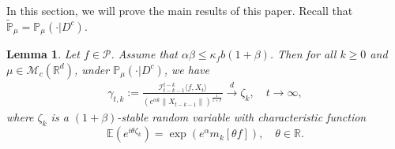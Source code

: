 \documentclass[12pt,a4paper]{amsart}
\theoremstyle{plain}
\newtheorem{lem}[thm]{Lemma}
\theoremstyle{definition}
\numberwithin{equation}{section}
\begin{document}
In this section, we will prove the main results of this paper. Recall that $\mathbb{\tilde{P}}_{\mu}=\mathbb{P}_{\mu}(\cdot|D^c)$.

\begin{lem}\label{lem: mainlemma}
Let $f\in \mathcal{P}$.
Assume that $\alpha\beta\leq \kappa_fb(1+\beta)$.
Then for all $k\geq 0$ and $\mu \in \mathcal M_c(\mathbb R^d)$, under $\mathbb{P}_{\mu}(\cdot | D ^c)$, we have
 \begin{equation}\begin{split}
      \gamma_{t,k}:=\frac{\mathcal I_{t-k-1}^{t-k}\langle f ,X_t\rangle}{(e^{\alpha k}\|X_{t-k-1}\|)^{\frac{1}{1+\beta}}}\xrightarrow{d}\zeta_k, \quad t\rightarrow \infty, \label{limitdistribution1}
 \end{split}\end{equation}
 where $\zeta_k$ is a $(1+\beta)$-stable random variable with characteristic function
 $$\mathbb{E}(e^{i\theta\zeta_k})=\exp(e^{\alpha}m_k[\theta f]),\quad \theta \in \mathbb R.$$
 \end{lem}
\end{document}
